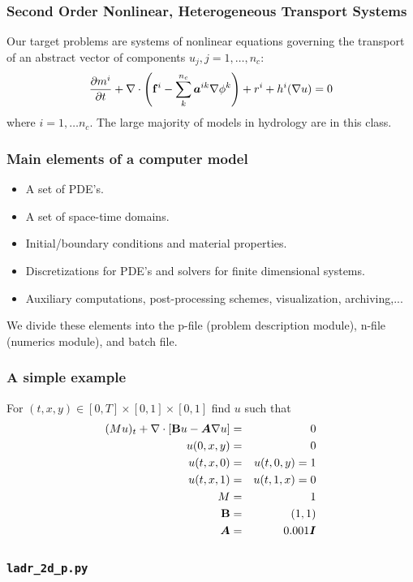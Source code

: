 \documentclass{beamer}
\begin{document}
\begin{frame}
\frametitle{Second Order Nonlinear, Heterogeneous Transport Systems}
Our target problems are systems of nonlinear equations governing the
transport of an abstract vector of components $u_j,j=1,\ldots,n_c$:
\begin{equation*}
\frac{\partial {m^i}}{\partial {t}} + \nabla \cdot \left( {\bf f}^i - \sum_k^{n_c} \mbox{{\boldmath ${a}$}}^{ik} \nabla \phi^k
\right) + r^i + h^i(\nabla u) = 0
\end{equation*}
where $i=1,\ldots n_c$. The large majority of models in hydrology are
in this class.
\end{frame}

\begin{frame}
\frametitle{Main elements of a computer model}
\begin{itemize}
\item A set of PDE's.
\item A set of space-time domains.
\item Initial/boundary conditions and material properties.
\item Discretizations for PDE's and solvers for finite dimensional
  systems.
\item Auxiliary computations, post-processing schemes, visualization,
  archiving,...
\end{itemize}
We divide these elements into the \alert{p-file} (problem description
module), \alert{n-file} (numerics module), and \alert{batch} file.
\end{frame}

\begin{frame}
\frametitle{A simple example} For $(t,x,y) \in [0,T] \times [0,1]
\times [0,1]$ find $u$ such that
\begin{eqnarray*}
(Mu)_t + \nabla \cdot \left[ {\bf B} u- \mbox{{\boldmath ${A}$}} \nabla u \right]&=& 0 \\ u(0,x,y)
  &=& 0 \\ u(t,x,0) &=& u(t,0,y) = 1 \\ u(t,x,1) &=& u(t,1,x) = 0
  \\ M&=&1\\ {\bf B}&=&(1,1)\\ \mbox{{\boldmath ${A}$}}&=&0.001 \mbox{{\boldmath ${I}$}}
\end{eqnarray*}
\end{frame}

\begin{frame}
\frametitle{\texttt{ladr\_2d\_p.py}} \small
%
\inputminted[linenos]{python}{ladr_2d_p.py}
\end{frame}
\end{document}
